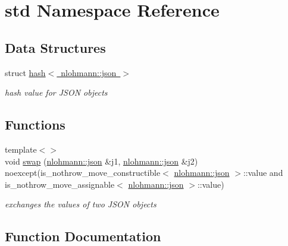 \hypertarget{namespacestd}{}\section{std Namespace Reference}
\label{namespacestd}
\subsection*{Data Structures}
\begin{DoxyCompactItemize}
\item 
struct \mbox{\hyperlink{structstd_1_1hash_3_01nlohmann_1_1json_01_4}{hash$<$ nlohmann\+::json $>$}}
\begin{DoxyCompactList}\small\item\em hash value for J\+S\+ON objects \end{DoxyCompactList}\end{DoxyCompactItemize}
\subsection*{Functions}
\begin{DoxyCompactItemize}
\item 
{\footnotesize template$<$$>$ }\\void \mbox{\hyperlink{namespacestd_a907191b7578e209391ce938e3b2afdf7}{swap}} (\mbox{\hyperlink{namespacenlohmann_a2bfd99e845a2e5cd90aeaf1b1431f474}{nlohmann\+::json}} \&j1, \mbox{\hyperlink{namespacenlohmann_a2bfd99e845a2e5cd90aeaf1b1431f474}{nlohmann\+::json}} \&j2) noexcept(is\+\_\+nothrow\+\_\+move\+\_\+constructible$<$ \mbox{\hyperlink{namespacenlohmann_a2bfd99e845a2e5cd90aeaf1b1431f474}{nlohmann\+::json}} $>$\+::value and is\+\_\+nothrow\+\_\+move\+\_\+assignable$<$ \mbox{\hyperlink{namespacenlohmann_a2bfd99e845a2e5cd90aeaf1b1431f474}{nlohmann\+::json}} $>$\+::value)
\begin{DoxyCompactList}\small\item\em exchanges the values of two J\+S\+ON objects \end{DoxyCompactList}\end{DoxyCompactItemize}


\subsection{Function Documentation}
\mbox{\label{namespacestd_a907191b7578e209391ce938e3b2afdf7}} 
